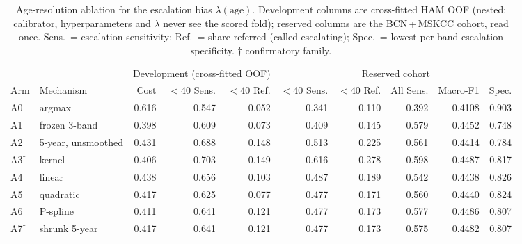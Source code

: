 \begin{table}[t]
\centering
\caption{Age-resolution ablation for the escalation bias $\lambda(\mathrm{age})$. Development columns are cross-fitted HAM OOF (nested: calibrator, hyperparameters and $\lambda$ never see the scored fold); reserved columns are the BCN\,+\,MSKCC cohort, read once. Sens.\ = escalation sensitivity; Ref.\ = share referred (called escalating); Spec.\ = lowest per-band escalation specificity. $\dagger$ confirmatory family.}
\label{tab:lambda_ablation}
\small
\begin{tabular}{llrrrrrrrr}
\toprule
 & & \multicolumn{3}{c}{Development (cross-fitted OOF)} & \multicolumn{5}{c}{Reserved cohort} \\
\cmidrule(lr){3-5}\cmidrule(lr){6-10}
Arm & Mechanism & Cost & $<$40 Sens. & $<$40 Ref. & $<$40 Sens. & $<$40 Ref. & All Sens. & Macro-F1 & Spec. \\
\midrule
A0 & argmax & 0.616 & 0.547 & 0.052 & 0.341 & 0.110 & 0.392 & 0.4108 & 0.903 \\
A1 & frozen 3-band & 0.398 & 0.609 & 0.073 & 0.409 & 0.145 & 0.579 & 0.4452 & 0.748 \\
A2 & 5-year, unsmoothed & 0.431 & 0.688 & 0.148 & 0.513 & 0.225 & 0.561 & 0.4414 & 0.784 \\
A3$^\dagger$ & kernel & 0.406 & 0.703 & 0.149 & 0.616 & 0.278 & 0.598 & 0.4487 & 0.817 \\
A4 & linear & 0.438 & 0.656 & 0.103 & 0.487 & 0.189 & 0.542 & 0.4438 & 0.826 \\
A5 & quadratic & 0.417 & 0.625 & 0.077 & 0.477 & 0.171 & 0.560 & 0.4440 & 0.824 \\
A6 & P-spline & 0.411 & 0.641 & 0.121 & 0.477 & 0.173 & 0.577 & 0.4486 & 0.807 \\
A7$^\dagger$ & shrunk 5-year & 0.417 & 0.641 & 0.121 & 0.477 & 0.173 & 0.575 & 0.4482 & 0.807 \\
\bottomrule
\end{tabular}
\end{table}
